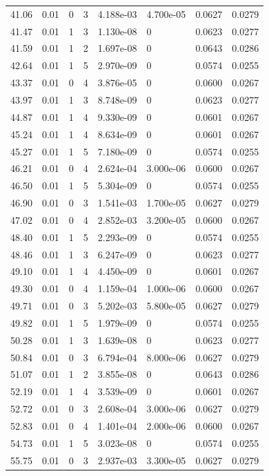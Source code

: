 \documentclass[preview]{standalone}
\begin{document}
{{{\begin{tabular}{L{1.2cm}C{1.2cm} C{0.3cm}C{0.5cm} C{1.4cm}C{1.4cm} C{1.4cm}C{1.4cm}}
  41.06  &  0.01  & 0     &  3 &  4.188e-03  & 4.700e-05  & 0.0627 &  0.0279   \\ 
  41.47  &  0.01  & 1     &  3 &  1.130e-08  & 0  & 0.0623 &  0.0277   \\ 
  41.59  &  0.01  & 1     &  2 &  1.697e-08  & 0  & 0.0643 &  0.0286   \\ 
  42.64  &  0.01  & 1     &  5 &  2.970e-09  & 0  & 0.0574 &  0.0255   \\ 
  43.37  &  0.01  & 0     &  4 &  3.876e-05  & 0  & 0.0600 &  0.0267   \\ 
  43.97  &  0.01  & 1     &  3 &  8.748e-09  & 0  & 0.0623 &  0.0277   \\ 
  44.87  &  0.01  & 1     &  4 &  9.330e-09  & 0  & 0.0601 &  0.0267   \\ 
  45.24  &  0.01  & 1     &  4 &  8.634e-09  & 0  & 0.0601 &  0.0267   \\ 
  45.27  &  0.01  & 1     &  5 &  7.180e-09  & 0  & 0.0574 &  0.0255   \\ 
  46.21  &  0.01  & 0     &  4 &  2.624e-04  & 3.000e-06  & 0.0600 &  0.0267   \\ 
  46.50  &  0.01  & 1     &  5 &  5.304e-09  & 0  & 0.0574 &  0.0255   \\ 
  46.90  &  0.01  & 0     &  3 &  1.541e-03  & 1.700e-05  & 0.0627 &  0.0279   \\ 
  47.02  &  0.01  & 0     &  4 &  2.852e-03  & 3.200e-05  & 0.0600 &  0.0267   \\ 
  48.40  &  0.01  & 1     &  5 &  2.293e-09  & 0  & 0.0574 &  0.0255   \\ 
  48.46  &  0.01  & 1     &  3 &  6.247e-09  & 0  & 0.0623 &  0.0277   \\ 
  49.10  &  0.01  & 1     &  4 &  4.450e-09  & 0  & 0.0601 &  0.0267   \\ 
  49.30  &  0.01  & 0     &  4 &  1.159e-04  & 1.000e-06  & 0.0600 &  0.0267   \\ 
  49.71  &  0.01  & 0     &  3 &  5.202e-03  & 5.800e-05  & 0.0627 &  0.0279   \\ 
  49.82  &  0.01  & 1     &  5 &  1.979e-09  & 0  & 0.0574 &  0.0255   \\ 
  50.28  &  0.01  & 1     &  3 &  1.639e-08  & 0  & 0.0623 &  0.0277   \\ 
  50.84  &  0.01  & 0     &  3 &  6.794e-04  & 8.000e-06  & 0.0627 &  0.0279   \\ 
  51.07  &  0.01  & 1     &  2 &  3.855e-08  & 0  & 0.0643 &  0.0286   \\ 
  52.19  &  0.01  & 1     &  4 &  3.539e-09  & 0  & 0.0601 &  0.0267   \\ 
  52.72  &  0.01  & 0     &  3 &  2.608e-04  & 3.000e-06  & 0.0627 &  0.0279   \\ 
  52.83  &  0.01  & 0     &  4 &  1.401e-04  & 2.000e-06  & 0.0600 &  0.0267   \\ 
  54.73  &  0.01  & 1     &  5 &  3.023e-08  & 0  & 0.0574 &  0.0255   \\ 
  55.75  &  0.01  & 0     &  3 &  2.937e-03  & 3.300e-05  & 0.0627 &  0.0279   \\ 
\hline 
\end{tabular} 

}}}
\end{document}

